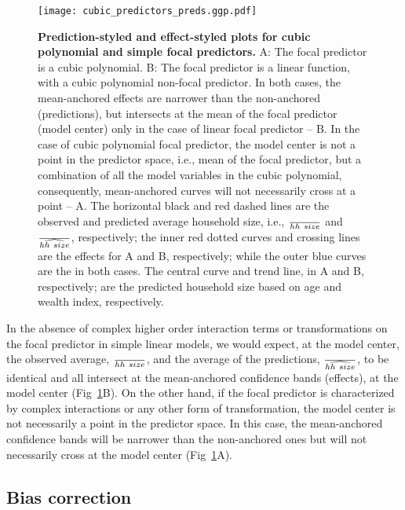 \begin{figure}[h]
\begin{center}
\texttt{[image: cubic\_predictors\_preds.ggp.pdf]}
\end{center}
\caption{{\bf Prediction-styled and effect-styled plots for cubic polynomial and simple focal predictors.} A: The focal predictor is a cubic polynomial. B: The focal predictor is a linear function, with a cubic polynomial non-focal predictor. In both cases, the mean-anchored effects are narrower than the non-anchored (predictions), but intersects at the mean of the focal predictor (model center) only in the case of linear focal predictor -- B. In the case of cubic polynomial focal predictor, the model center is not a point in the predictor space, i.e., mean of the focal predictor, but a combination of all the model variables in the cubic polynomial, consequently, mean-anchored curves will not necessarily cross at a point -- A. The horizontal black and red dashed lines are the observed and predicted average household size, i.e., $\over{hh~size}$ and $\over{\widehat{hh~size}}$, respectively; the inner red dotted curves and crossing lines are the effects for A and B, respectively; while the outer blue curves are the  in both cases. The central curve and trend line, in A and B, respectively; are the predicted household size based on age and wealth index, respectively. }
\label{fig:pred_cubic_plots}
\end{figure}

In the absence of complex higher order interaction terms or transformations on the focal predictor in simple linear models, we would expect, at the model center, the observed average, $\over{hh~size}$, and the average of the predictions, $\over{\widehat{hh~size}}$, to be identical and all intersect at the mean-anchored confidence bands (effects), at the model center (Fig~\ref{fig:pred_cubic_plots}B). On the other hand, if the focal predictor is characterized by complex interactions or any other form of transformation, the model center is not necessarily a point in the predictor space. In this case, the mean-anchored confidence bands will be narrower than the non-anchored ones but will not necessarily cross at the model center (Fig~\ref{fig:pred_cubic_plots}A).

\subsection{Bias correction}

